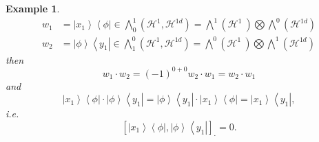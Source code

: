 \documentclass[aps,preprint]{revtex4}%
\newtheorem{example}[theorem]{Example}
\begin{document}
\begin{example}%
\begin{align}
w_{1}  &  =\left\vert x_{1}\right\rangle \left\langle \phi\right\vert \in%
{\textstyle\bigwedge\nolimits_{0}^{1}}
\left(  \mathcal{H}^{1},\mathcal{H}^{1d}\right)  =%
{\textstyle\bigwedge\nolimits^{1}}
\left(  \mathcal{H}^{1}\ \right)
{\textstyle\bigotimes}
{\textstyle\bigwedge\nolimits^{0}}
\left(  \mathcal{H}^{1d}\right) \\
w_{2}  &  =\left\vert \phi\right\rangle \left\langle y_{1}\right\vert \in%
{\textstyle\bigwedge\nolimits_{1}^{0}}
\left(  \mathcal{H}^{1},\mathcal{H}^{1d}\right)  =%
{\textstyle\bigwedge\nolimits^{0}}
\left(  \mathcal{H}^{1}\ \right)
{\textstyle\bigotimes}
{\textstyle\bigwedge\nolimits^{1}}
\left(  \mathcal{H}^{1d}\right)
\end{align}
then
\begin{equation}
w_{1}\cdot w_{2}=\left(  -1\right)  ^{0+0}w_{2}\cdot w_{1}=w_{2}\cdot w_{1}%
\end{equation}
and
\begin{equation}
\left\vert x_{1}\right\rangle \left\langle \phi\right\vert \cdot\left\vert
\phi\right\rangle \left\langle y_{1}\right\vert =\left\vert \phi\right\rangle
\left\langle y_{1}\right\vert \cdot\left\vert x_{1}\right\rangle \left\langle
\phi\right\vert =\left\vert x_{1}\right\rangle \left\langle y_{1}\right\vert ,
\end{equation}
i.e.%
\begin{equation}
\left[  \left\vert x_{1}\right\rangle \left\langle \phi\right\vert ,\left\vert
\phi\right\rangle \left\langle y_{1}\right\vert \right]  _{\cdot}=0.
\end{equation}

\end{example}
\end{document}
